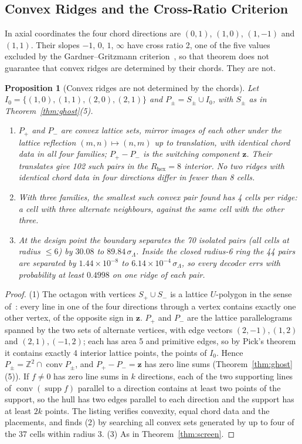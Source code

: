\documentclass[11pt,a4paper]{article}
\newtheorem{proposition}[theorem]{Proposition}
\theoremstyle{definition}
\theoremstyle{remark}
\begin{document}
\subsection{Convex Ridges and the Cross-Ratio Criterion}\label{sec:convex}
In axial coordinates the four chord directions are $(0,1)$, $(1,0)$, $(1,-1)$ and $(1,1)$. Their slopes $-1$, $0$, $1$, $\infty$ have cross ratio 2, one of the five values excluded by the Gardner--Gritzmann criterion~\cite{gardner1997}, so that theorem does not guarantee that convex ridges are determined by their chords. They are not.

\begin{proposition}[Convex ridges are not determined by the chords]\label{prop:convex}
Let $I_0 = \{(1,0),(1,1),(2,0),(2,1)\}$ and $P_\pm = S_\pm\cup I_0$, with $S_\pm$ as in Theorem~\ref{thm:ghost}(5).
\begin{enumerate}
\item $P_+$ and $P_-$ are convex lattice sets, mirror images of each other under the lattice reflection $(m,n)\mapsto(n,m)$ up to translation, with identical chord data in all four families; $P_+-P_-$ is the switching component $\mathbf{z}$. Their translates give 102 such pairs in the $R_{\text{hex}} = 8$ interior. No two ridges with identical chord data in four directions differ in fewer than 8 cells.
\item With three families, the smallest such convex pair found has 4 cells per ridge: a cell with three alternate neighbours, against the same cell with the other three.
\item At the design point the boundary separates the 70 isolated pairs (all cells at radius $\le6$) by $30.08$ to $89.84\,\sigma_\Lambda$. Inside the closed radius-6 ring the 44 pairs are separated by $1.44\times10^{-8}$ to $6.14\times10^{-4}\,\sigma_\Lambda$, so every decoder errs with probability at least $0.4998$ on one ridge of each pair.
\end{enumerate}
\end{proposition}
\begin{proof}
(1) The octagon with vertices $S_+\cup S_-$ is a lattice $U$-polygon in the sense of~\cite{gardner1997}: every line in one of the four directions through a vertex contains exactly one other vertex, of the opposite sign in $\mathbf{z}$. $P_+$ and $P_-$ are the lattice parallelograms spanned by the two sets of alternate vertices, with edge vectors $(2,-1),(1,2)$ and $(2,1),(-1,2)$; each has area 5 and primitive edges, so by Pick's theorem it contains exactly 4 interior lattice points, the points of $I_0$. Hence $P_\pm = \mathbb{Z}^2\cap\operatorname{conv}P_\pm$, and $P_+-P_- = \mathbf{z}$ has zero line sums (Theorem~\ref{thm:ghost}(5)). If $f\ne0$ has zero line sums in $k$ directions, each of the two supporting lines of $\operatorname{conv}(\operatorname{supp}f)$ parallel to a direction contains at least two points of the support, so the hull has two edges parallel to each direction and the support has at least $2k$ points. The listing verifies convexity, equal chord data and the placements, and finds (2) by searching all convex sets generated by up to four of the 37 cells within radius 3. (3) As in Theorem~\ref{thm:screen}.
\end{proof}
\end{document}
